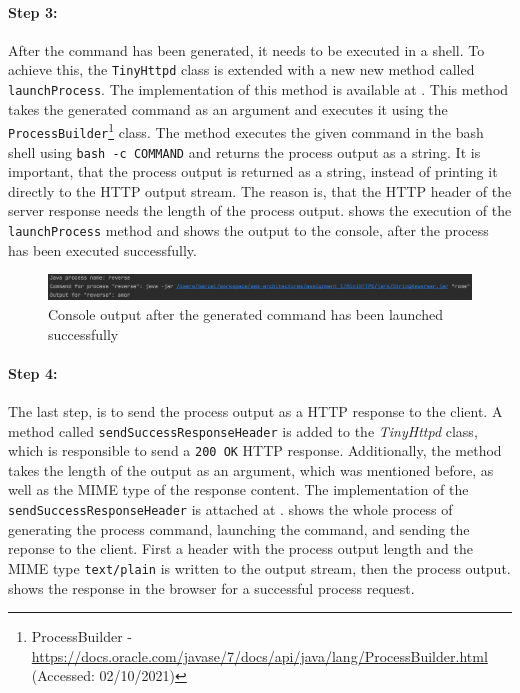 \paragraph{Step 3:}
After the command has been generated, it needs to be executed in a shell. To achieve this, the \texttt{TinyHttpd} class is extended with a new new method called \texttt{launchProcess}. The implementation of this method is available at . This method takes the generated command as an argument and executes it using the \texttt{ProcessBuilder}\footnote{ProcessBuilder - \url{https://docs.oracle.com/javase/7/docs/api/java/lang/ProcessBuilder.html} (Accessed: 02/10/2021)} class.
The method executes the given command in the bash shell using \texttt{bash -c COMMAND} and returns the process output as a string. It is important, that the process output is returned as a string, instead of printing it directly to the HTTP output stream. The reason is, that the HTTP header of the server response needs the length of the process output.
 shows the execution of the \texttt{launchProcess} method and  shows the output to the console, after the process has been executed successfully.

\begin{figure}[h]
\centering
\includegraphics[scale=0.3]{images/implementationOutput}
\caption{Console output after the generated command has been launched successfully}
\label{fig:01_part1_impl_output}
\end{figure}


\paragraph{Step 4:}
The last step, is to send the process output as a HTTP response to the client.
A method called \texttt{sendSuccessResponseHeader} is added to the \textit{TinyHttpd} class, which is responsible to send a \texttt{200 OK} HTTP response. Additionally, the method takes the length of the output as an argument, which was mentioned before, as well as the MIME type of the response content. The implementation of the \texttt{sendSuccessResponseHeader} is attached at .
 shows the whole process of generating the process command, launching the command, and sending the reponse to the client. First a header with the process output length and the MIME type \texttt{text/plain} is written to the output stream, then the process output.  shows the response in the browser for a successful process request.

